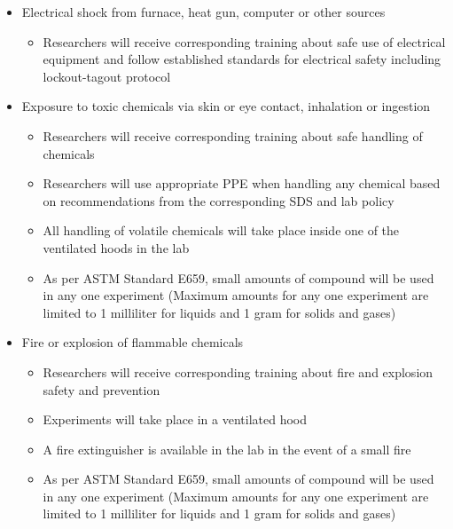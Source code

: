\documentclass[letterpaper,11pt]{article}
\begin{document}
\begin{itemize}
\item Electrical shock from furnace, heat gun, computer or other sources
    \begin{itemize}
    \item Researchers will receive corresponding training about safe use of 
        electrical equipment and follow established standards for electrical 
        safety including lockout-tagout protocol
    \end{itemize}

\item Exposure to toxic chemicals via skin or eye contact, inhalation or 
    ingestion
    \begin{itemize}
    \item Researchers will receive corresponding training about safe handling of
        chemicals
    \item Researchers will use appropriate PPE when handling any chemical based 
        on recommendations from the corresponding SDS and lab policy
    \item All handling of volatile chemicals will take place inside one of the 
    ventilated hoods in the lab
    \item As per ASTM Standard E659, small amounts of compound will be used in 
        any one experiment (Maximum amounts for any one experiment are limited 
        to 1 milliliter for liquids and 1 gram for solids and gases)
    \end{itemize}

\item Fire or explosion of flammable chemicals
    \begin{itemize}
    \item Researchers will receive corresponding training about fire and 
        explosion safety and prevention
    \item Experiments will take place in a ventilated hood
    \item A fire extinguisher is available in the lab in the event of a small 
        fire
    \item As per ASTM Standard E659, small amounts of compound will be used in 
        any one experiment (Maximum amounts for any one experiment are limited 
        to 1 milliliter for liquids and 1 gram for solids and gases)
    \end{itemize}  

\end{itemize}
\end{document}
